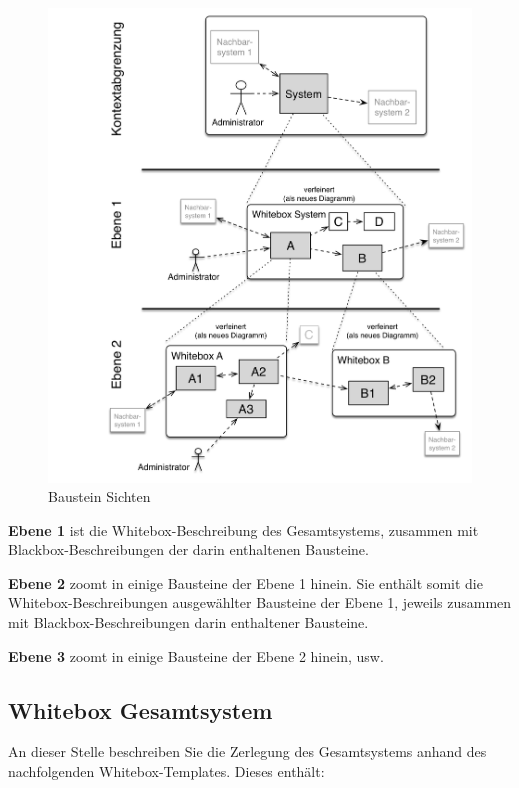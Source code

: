 \begin{figure}
\centering
\includegraphics{../images/05_building_blocks-DE.png}
\caption{Baustein Sichten}
\end{figure}

\textbf{Ebene 1} ist die Whitebox-Beschreibung des Gesamtsystems,
zusammen mit Blackbox-Beschreibungen der darin enthaltenen Bausteine.

\textbf{Ebene 2} zoomt in einige Bausteine der Ebene 1 hinein. Sie
enthält somit die Whitebox-Beschreibungen ausgewählter Bausteine der
Ebene 1, jeweils zusammen mit Blackbox-Beschreibungen darin enthaltener
Bausteine.

\textbf{Ebene 3} zoomt in einige Bausteine der Ebene 2 hinein, usw.

\hypertarget{whitebox-gesamtsystem}{%
\subsection{Whitebox Gesamtsystem}\label{whitebox-gesamtsystem}}

An dieser Stelle beschreiben Sie die Zerlegung des Gesamtsystems anhand
des nachfolgenden Whitebox-Templates. Dieses enthält:

